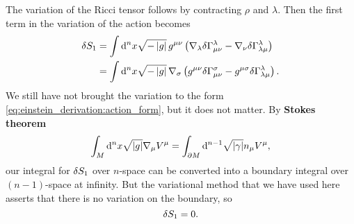 The variation of the Ricci tensor follows by contracting $\rho$ and $\lambda$. 
Then the first term in the variation of the action becomes
\begin{equation}
\begin{split}
	\delta S_1 &= \int \mathop{}\!\mathrm{d}^n x \sqrt{-\left\lvert g \right\rvert} \, g^{\mu \nu} \left( \nabla_\lambda \delta \Gamma^\lambda_{\mu \nu} - \nabla_\nu \delta \Gamma^\lambda_{\lambda \mu} \right) \\
	                &= \int \mathop{}\!\mathrm{d}^n x \sqrt{-\left\lvert g \right\rvert} \, \nabla_\sigma \left( g^{\mu \nu} \delta \Gamma^\sigma_{\mu \nu} - g^{\mu \sigma} \delta \Gamma^\lambda_{\lambda \mu} \right) . \\
	\label{eq:einstein_derivation:ds1_intermediate}
\end{split}
\end{equation}
We still have not brought the variation to the form \eqref{eq:einstein_derivation:action_form}, but it does not matter.
By \textbf{Stokes theorem} \cite[equation 3.35]{ref:carroll}
\begin{equation}
	\int_M \mathop{}\!\mathrm{d}^n x \sqrt{\left\lvert g \right\rvert} \nabla_\mu V^\mu = \int_{\partial M} \mathop{}\!\mathrm{d}^{n-1} \sqrt{\left\lvert \gamma \right\rvert} n_\mu V^\mu ,
\end{equation}
our integral for $\delta S_1$ over $n$-space can be converted into a boundary integral over $(n-1)$-space at infinity.
But the variational method that we have used here asserts that there is no variation on the boundary, so
\begin{equation}
	\delta S_1 = 0 .
\end{equation}


